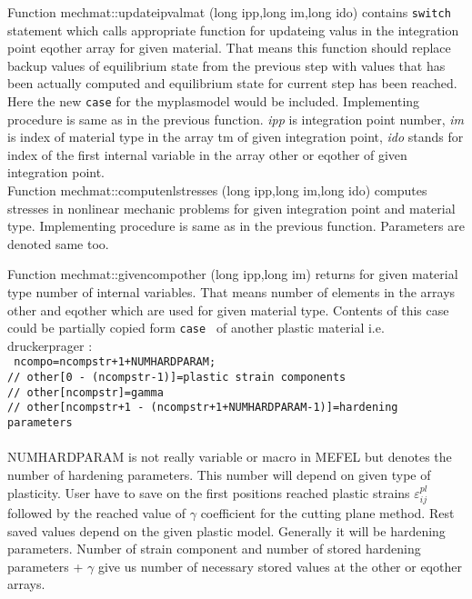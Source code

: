 Function {\sf mechmat::updateipvalmat (long ipp,long im,long ido)} contains {\tt switch} statement which calls appropriate function 
for updateing valus in the integration point {\sf eqother} array for given material. That means this function should replace 
backup values of equilibrium state from the previous step with values that has been actually computed and equilibrium state for current step
has been reached. Here the new {\tt case} for the  {\sf myplasmodel} would be included. Implementing procedure is same
as in the previous function. {\it ipp} is integration point number, {\it im} is index of material type in the array {\sf tm} of given integration point, 
{\it ido} stands for index of the first internal variable in the array {\sf other} or {\sf eqother} of given integration point.\\

Function {\sf mechmat::computenlstresses (long ipp,long im,long ido)} computes stresses in nonlinear mechanic problems for given integration
point and material type. Implementing procedure is same as in the previous function. Parameters are denoted same too.

Function {\sf mechmat::givencompother (long ipp,long im)} returns for given material type number of internal variables. That means
number of elements in the arrays {\sf other} and {\sf eqother} which are used for given material type.
Contents of this case could be partially copied form {\tt case } of another plastic
material i.e. druckerprager :\\
{\tt
    ncompo=ncompstr+1+NUMHARDPARAM;\\
    //  other[0 - (ncompstr-1)]=plastic strain components\\
    //  other[ncompstr]=gamma\\
    //  other[ncompstr+1 - (ncompstr+1+NUMHARDPARAM-1)]=hardening parameters\\
}\\
NUMHARDPARAM is not really variable or macro in MEFEL but denotes the number of hardening parameters.
This number will depend on given type of plasticity. User have to save on the first positions reached
plastic strains $\varepsilon^{pl}_{ij}$ followed by the reached value of $\gamma$ coefficient for the cutting
plane method. Rest saved values depend on the given plastic model. Generally it will be hardening parameters.
Number of strain component and number of stored hardening parameters + $\gamma$ give us number of necessary
stored values at the {\sf other} or {\sf eqother} arrays.

